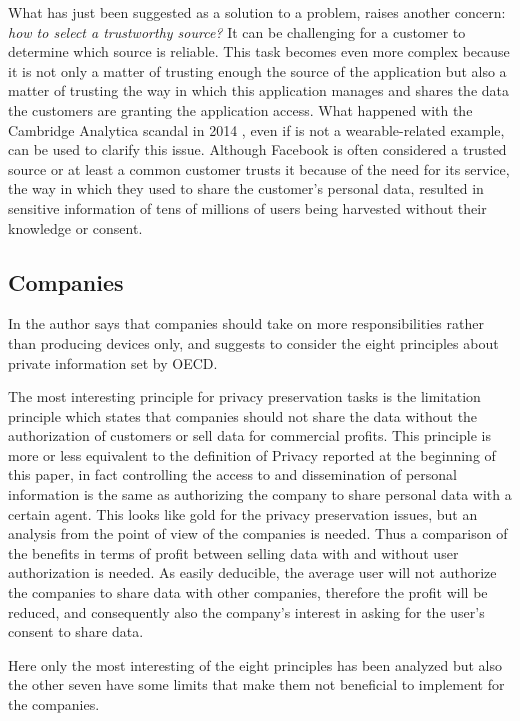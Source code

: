 \documentclass{article}
\begin{document}
What has just been suggested as a solution to a problem, raises another concern: \textit{how to select a trustworthy source?} It can be challenging for a customer to determine which source is reliable. This task becomes even more complex because it is not only a matter of trusting enough the source of the application but also a matter of trusting the way in which this application manages and shares the data the customers are granting the application access. What happened with the Cambridge Analytica scandal in 2014 \cite{chang_facebook_2018}, even if is not a wearable-related example, can be used to clarify this issue. Although Facebook is often considered a trusted source or at least a common customer trusts it because of the need for its service, the way in which they used to share the customer's personal data, resulted in sensitive information of tens of millions of users being harvested without their knowledge or consent.
\subsection{Companies}
In \cite{chang_ethical_2019} the author says that companies should take on more responsibilities rather than producing devices only, and suggests to consider the eight principles about private information set by OECD.\cite{noauthor_oecd_nodate}

The most interesting principle for privacy preservation tasks is the limitation principle which states that companies should not share the data without the authorization of customers or sell data for commercial profits. This principle is more or less equivalent to the definition of Privacy reported at the beginning of this paper, in fact controlling the access to and dissemination of personal information is the same as authorizing the company to share personal data with a certain agent. This looks like gold for the privacy preservation issues, but an analysis from the point of view of the companies is needed. Thus a comparison of the benefits in terms of profit between selling data with and without user authorization is needed.  As easily deducible, the average user will not authorize the companies to share data with other companies, therefore the profit will be reduced, and consequently also the company’s interest in asking for the user’s consent to share data.

Here only the most interesting of the eight principles has been analyzed but also the other seven have some limits that make them not beneficial to implement for the companies. 
\end{document}
